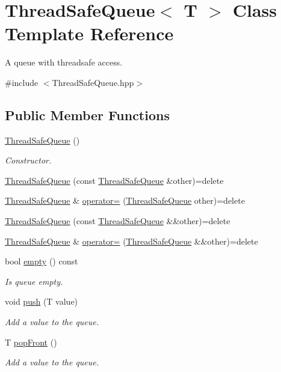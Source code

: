 \hypertarget{class_thread_safe_queue}{}\section{Thread\+Safe\+Queue$<$ T $>$ Class Template Reference}
\label{class_thread_safe_queue}


A queue with threadsafe access.  




{\ttfamily \#include $<$Thread\+Safe\+Queue.\+hpp$>$}

\subsection*{Public Member Functions}
\begin{DoxyCompactItemize}
\item 
\hyperlink{class_thread_safe_queue_a06e14823003cc9b5d9e9151380077f08}{Thread\+Safe\+Queue} ()
\begin{DoxyCompactList}\small\item\em Constructor. \end{DoxyCompactList}\item 
\hyperlink{class_thread_safe_queue_a0f3f492104e38b019a5e1a74647cec39}{Thread\+Safe\+Queue} (const \hyperlink{class_thread_safe_queue}{Thread\+Safe\+Queue} \&other)=delete
\item 
\hyperlink{class_thread_safe_queue}{Thread\+Safe\+Queue} \& \hyperlink{class_thread_safe_queue_a6efd6d8c1d87c21d5bb422e18775e410}{operator=} (\hyperlink{class_thread_safe_queue}{Thread\+Safe\+Queue} other)=delete
\item 
\hyperlink{class_thread_safe_queue_a51c1e1c4eb980e2cb5d3012de447bbd5}{Thread\+Safe\+Queue} (const \hyperlink{class_thread_safe_queue}{Thread\+Safe\+Queue} \&\&other)=delete
\item 
\hyperlink{class_thread_safe_queue}{Thread\+Safe\+Queue} \& \hyperlink{class_thread_safe_queue_a10875bf953a8841619ba5bfa92e618be}{operator=} (\hyperlink{class_thread_safe_queue}{Thread\+Safe\+Queue} \&\&other)=delete
\item 
bool \hyperlink{class_thread_safe_queue_a58b5532baa6110071f697ad1f9bfbf58}{empty} () const
\begin{DoxyCompactList}\small\item\em Is queue empty. \end{DoxyCompactList}\item 
void \hyperlink{class_thread_safe_queue_a3577c6ce241a6d20895ca7c53e19159c}{push} (T value)
\begin{DoxyCompactList}\small\item\em Add a value to the queue. \end{DoxyCompactList}\item 
T \hyperlink{class_thread_safe_queue_a16adc591a14f9ed797dab4417c7ce0be}{pop\+Front} ()
\begin{DoxyCompactList}\small\item\em Add a value to the queue. \end{DoxyCompactList}\end{DoxyCompactItemize}
